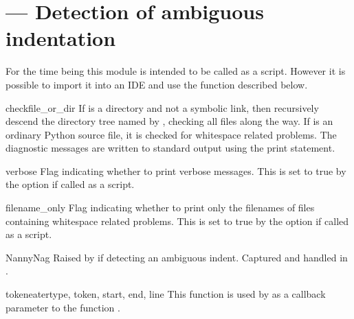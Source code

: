 \section{ ---
         Detection of ambiguous indentation}



For the time being this module is intended to be called as a script.
However it is possible to import it into an IDE and use the function
 described below.


\begin{funcdesc}{check}{file_or_dir}
  If  is a directory and not a symbolic link, then
  recursively descend the directory tree named by ,
  checking all  files along the way.  If 
  is an ordinary Python source file, it is checked for whitespace
  related problems.  The diagnostic messages are written to standard
  output using the print statement.
\end{funcdesc}


\begin{datadesc}{verbose}
  Flag indicating whether to print verbose messages.
  This is set to true by the  option if called as a script.
\end{datadesc}


\begin{datadesc}{filename_only}
  Flag indicating whether to print only the filenames of files
  containing whitespace related problems.  This is set to true by the
   option if called as a script.
\end{datadesc}


\begin{excdesc}{NannyNag}
  Raised by  if detecting an ambiguous indent.
  Captured and handled in .
\end{excdesc}


\begin{funcdesc}{tokeneater}{type, token, start, end, line}
  This function is used by  as a callback parameter to
  the function .
\end{funcdesc}


\begin{seealso}
\end{seealso}
